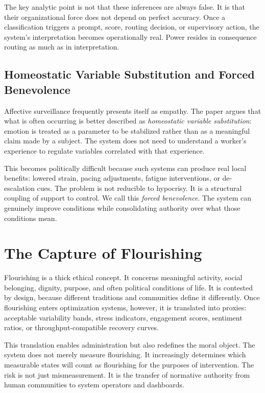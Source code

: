 \documentclass[11pt, a4paper]{article}
\begin{document}
The key analytic point is not that these inferences are always false. It is that their organizational force does not depend on perfect accuracy. Once a classification triggers a prompt, score, routing decision, or supervisory action, the system's interpretation becomes operationally real. Power resides in consequence routing as much as in interpretation.

\subsection{Homeostatic Variable Substitution and Forced Benevolence}

Affective surveillance frequently presents itself as empathy. The paper argues that what is often occurring is better described as \emph{homeostatic variable substitution}: emotion is treated as a parameter to be stabilized rather than as a meaningful claim made by a subject. The system does not need to understand a worker's experience to regulate variables correlated with that experience.

This becomes politically difficult because such systems can produce real local benefits: lowered strain, pacing adjustments, fatigue interventions, or de-escalation cues. The problem is not reducible to hypocrisy. It is a structural coupling of support to control. We call this \emph{forced benevolence}. The system can genuinely improve conditions while consolidating authority over what those conditions mean.

\section{The Capture of Flourishing}

Flourishing is a thick ethical concept. It concerns meaningful activity, social belonging, dignity, purpose, and often political conditions of life. It is contested by design, because different traditions and communities define it differently. Once flourishing enters optimization systems, however, it is translated into proxies: acceptable variability bands, stress indicators, engagement scores, sentiment ratios, or throughput-compatible recovery curves.

This translation enables administration but also redefines the moral object. The system does not merely measure flourishing. It increasingly determines which measurable states will count as flourishing for the purposes of intervention. The risk is not just mismeasurement. It is the transfer of normative authority from human communities to system operators and dashboards.
\end{document}
